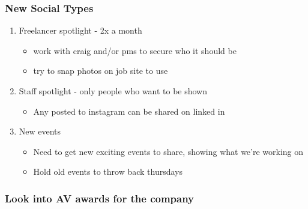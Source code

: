 \documentclass[11pt]{article}
\begin{document}
\subsubsection{New Social Types}
\label{sec:orgb49c4b0}
\begin{enumerate}
\item Freelancer spotlight - 2x a month
\label{sec:org5ae058c}
\begin{itemize}
\item work with craig and/or pms to secure who it should be
\item try to snap photos on job site to use
\end{itemize}
\item Staff spotlight - only people who want to be shown
\label{sec:org426a4db}
\begin{itemize}
\item Any posted to instagram can be shared on linked in
\end{itemize}
\item New events
\label{sec:org50df02d}
\begin{itemize}
\item Need to get new exciting events to share, showing what we're working on
\item Hold old events to throw back thursdays
\end{itemize}
\end{enumerate}
\subsubsection{Look into AV awards  for the company}
\label{sec:orge11ea48}
\end{document}
